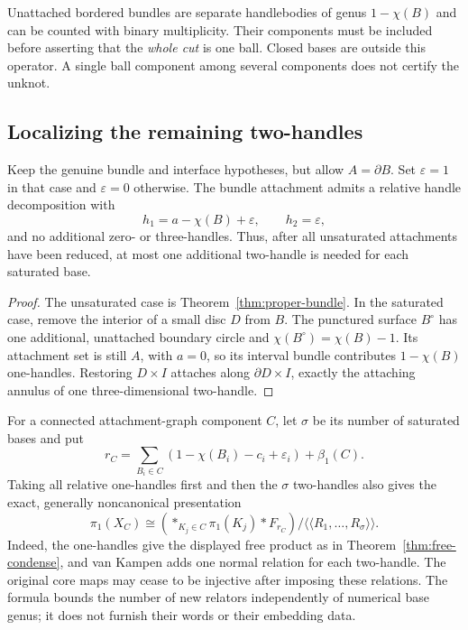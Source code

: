 Unattached bordered bundles are separate handlebodies of genus
$1-\chi(B)$ and can be counted with binary multiplicity.  Their components
must be included before asserting that the \emph{whole cut} is one ball.
Closed bases are outside this operator.  A single ball component among
several components does not certify the unknot.

\subsection{Localizing the remaining two-handles}

\begin{corollary}\label{cor:saturation-localize}
Keep the genuine bundle and interface hypotheses, but allow $A=\partial B$.
Set $\varepsilon=1$ in that case and $\varepsilon=0$ otherwise.  The bundle
attachment admits a relative handle decomposition with
\[
 h_1=a-\chi(B)+\varepsilon,\qquad h_2=\varepsilon,
\]
and no additional zero- or three-handles.  Thus, after all unsaturated
attachments have been reduced, at most one additional two-handle is
needed for each saturated base.
\end{corollary}
\begin{proof}
The unsaturated case is Theorem~\ref{thm:proper-bundle}.  In the saturated
case, remove the interior of a small disc $D$ from $B$.  The punctured
surface $B^\circ$ has one additional, unattached boundary circle and
$\chi(B^\circ)=\chi(B)-1$.  Its attachment set is still $A$, with $a=0$,
so its interval bundle contributes $1-\chi(B)$ one-handles.  Restoring
$D\times I$ attaches along $\partial D\times I$, exactly the attaching
annulus of one three-dimensional two-handle.
\end{proof}

For a connected attachment-graph component $C$, let $\sigma$ be its
number of saturated bases and put
\[
 r_C=\sum_{B_i\in C}(1-\chi(B_i)-c_i+\varepsilon_i)+\beta_1(C).
\]
Taking all relative one-handles first and then the $\sigma$ two-handles
also gives the exact, generally noncanonical presentation
\begin{equation}\label{eq:bounded-relators}
 \pi_1(X_C)\cong
 \left(\mathop{*}_{K_j\in C}\pi_1(K_j)*F_{r_C}\right)
 \big/\langle\!\langle R_1,\ldots,R_\sigma\rangle\!\rangle.
\end{equation}
Indeed, the one-handles give the displayed free product as in
Theorem~\ref{thm:free-condense}, and van Kampen adds one normal relation
for each two-handle.  The original core maps may cease to be injective
after imposing these relations.  The formula bounds the number of new
relators independently of numerical base genus; it does not furnish
their words or their embedding data.

